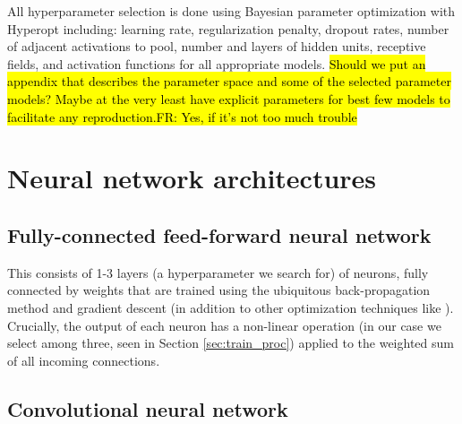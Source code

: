 \documentclass[utf8]{frontiersSCNS} %
\newcommand{\FR}[1]{{\small \textcolor{red}{\hl{FR: #1}}}}
\begin{document}
All hyperparameter selection is done using Bayesian parameter optimization with Hyperopt \cite{Bergstra2013}  including: learning rate, regularization penalty, dropout rates, number of adjacent activations to pool, number and layers of hidden units, receptive fields, and activation functions for all appropriate models. \hl{Should we put an appendix that describes the parameter space and some of the selected parameter models? Maybe at the very least have explicit parameters for best few models to facilitate any reproduction.}\FR{Yes, if it's not too much trouble}

\section{Neural network architectures}

\subsection{Fully-connected feed-forward neural network}

This consists of 1-3 layers (a hyperparameter we search for) of neurons, fully connected by weights that are trained using the ubiquitous back-propagation method \cite{Lecunn_phd, GoodfellowTextbook} and gradient descent (in addition to other optimization techniques like \cite{adam, rmsprop, etc}). Crucially, the output of each neuron has a non-linear operation (in our case we select among three, seen in Section \ref{sec:train_proc}) applied to the weighted sum of all incoming connections. %

\subsection{Convolutional neural network}

\end{document}
